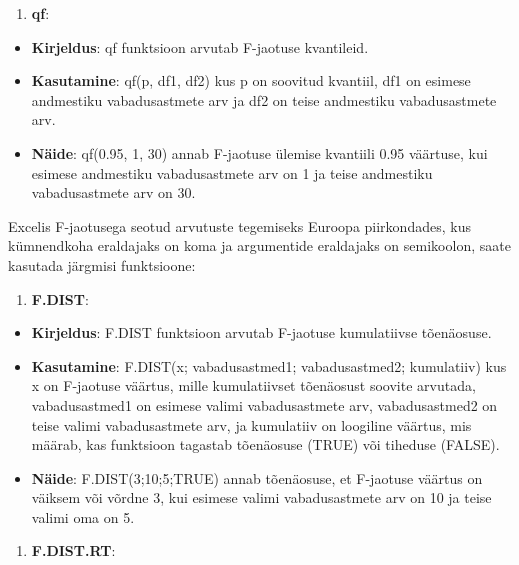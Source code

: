 \documentclass[
]{book}
\providecommand{\tightlist}{%
  \setlength{\itemsep}{0pt}\setlength{\parskip}{0pt}}
\begin{document}
\begin{enumerate}
\def\labelenumi{\arabic{enumi}.}
\setcounter{enumi}{2}
\tightlist
\item
  \textbf{qf}:
\end{enumerate}

\begin{itemize}
\tightlist
\item
  \textbf{Kirjeldus}: qf funktsioon arvutab F-jaotuse kvantileid.
\item
  \textbf{Kasutamine}: qf(p, df1, df2) kus p on soovitud kvantiil, df1 on esimese andmestiku vabadusastmete arv ja df2 on teise andmestiku vabadusastmete arv.
\item
  \textbf{Näide}: qf(0.95, 1, 30) annab F-jaotuse ülemise kvantiili 0.95 väärtuse, kui esimese andmestiku vabadusastmete arv on 1 ja teise andmestiku vabadusastmete arv on 30.
\end{itemize}

Excelis F-jaotusega seotud arvutuste tegemiseks Euroopa piirkondades, kus kümnendkoha eraldajaks on koma ja argumentide eraldajaks on semikoolon, saate kasutada järgmisi funktsioone:

\begin{enumerate}
\def\labelenumi{\arabic{enumi}.}
\tightlist
\item
  \textbf{F.DIST}:
\end{enumerate}

\begin{itemize}
\tightlist
\item
  \textbf{Kirjeldus}: F.DIST funktsioon arvutab F-jaotuse kumulatiivse tõenäosuse.
\item
  \textbf{Kasutamine}: F.DIST(x; vabadusastmed1; vabadusastmed2; kumulatiiv) kus x on F-jaotuse väärtus, mille kumulatiivset tõenäosust soovite arvutada, vabadusastmed1 on esimese valimi vabadusastmete arv, vabadusastmed2 on teise valimi vabadusastmete arv, ja kumulatiiv on loogiline väärtus, mis määrab, kas funktsioon tagastab tõenäosuse (TRUE) või tiheduse (FALSE).
\item
  \textbf{Näide}: F.DIST(3;10;5;TRUE) annab tõenäosuse, et F-jaotuse väärtus on väiksem või võrdne 3, kui esimese valimi vabadusastmete arv on 10 ja teise valimi oma on 5.
\end{itemize}

\begin{enumerate}
\def\labelenumi{\arabic{enumi}.}
\setcounter{enumi}{1}
\tightlist
\item
  \textbf{F.DIST.RT}:
\end{enumerate}
\end{document}
